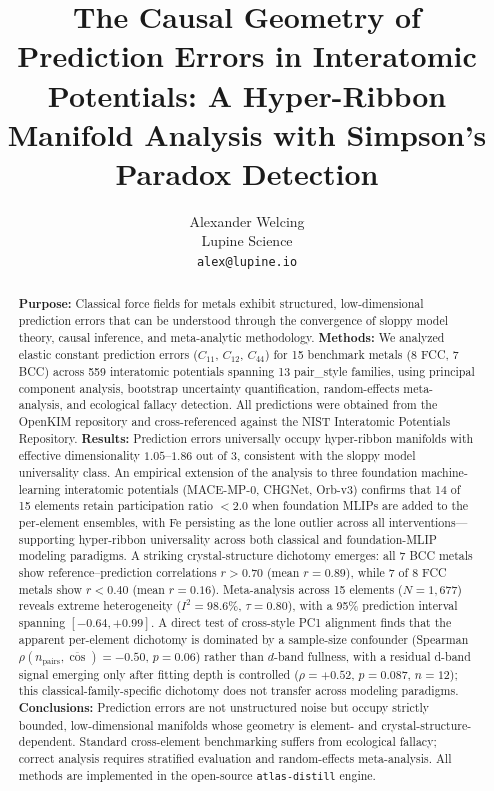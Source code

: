 \documentclass[twocolumn,9pt]{extarticle}
\begin{document}
\title{\bfseries The Causal Geometry of Prediction Errors in Interatomic Potentials: A Hyper-Ribbon Manifold Analysis with Simpson's Paradox Detection}
\author{Alexander Welcing\\
\small Lupine Science\\
\small \texttt{alex@lupine.io}}
\date{}

\begin{abstract}
\noindent\textbf{Purpose:} Classical force fields for metals exhibit structured, low-dimensional prediction errors that can be understood through the convergence of sloppy model theory, causal inference, and meta-analytic methodology.
\textbf{Methods:} We analyzed elastic constant prediction errors ($C_{11}$, $C_{12}$, $C_{44}$) for 15 benchmark metals (8 FCC, 7 BCC) across 559 interatomic potentials spanning 13 pair\_style families, using principal component analysis, bootstrap uncertainty quantification, random-effects meta-analysis, and ecological fallacy detection. All predictions were obtained from the OpenKIM repository and cross-referenced against the NIST Interatomic Potentials Repository.
\textbf{Results:} Prediction errors universally occupy hyper-ribbon manifolds with effective dimensionality $1.05$--$1.86$ out of 3, consistent with the sloppy model universality class. An empirical extension of the analysis to three foundation machine-learning interatomic potentials (MACE-MP-0, CHGNet, Orb-v3) confirms that 14 of 15 elements retain participation ratio $<2.0$ when foundation MLIPs are added to the per-element ensembles, with Fe persisting as the lone outlier across all interventions---supporting hyper-ribbon universality across both classical and foundation-MLIP modeling paradigms. A striking crystal-structure dichotomy emerges: all 7 BCC metals show reference--prediction correlations $r>0.70$ (mean $r=0.89$), while 7 of 8 FCC metals show $r<0.40$ (mean $r=0.16$). Meta-analysis across 15 elements ($N=1{,}677$) reveals extreme heterogeneity ($I^2=98.6\%$, $\tau=0.80$), with a 95\% prediction interval spanning $[-0.64, +0.99]$. A direct test of cross-style PC1 alignment finds that the apparent per-element dichotomy is dominated by a sample-size confounder (Spearman $\rho(n_{\text{pairs}}, \overline{\cos}) = -0.50$, $p = 0.06$) rather than $d$-band fullness, with a residual d-band signal emerging only after fitting depth is controlled ($\rho = +0.52$, $p = 0.087$, $n=12$); this classical-family-specific dichotomy does not transfer across modeling paradigms.
\textbf{Conclusions:} Prediction errors are not unstructured noise but occupy strictly bounded, low-dimensional manifolds whose geometry is element- and crystal-structure-dependent. Standard cross-element benchmarking suffers from ecological fallacy; correct analysis requires stratified evaluation and random-effects meta-analysis. All methods are implemented in the open-source \texttt{atlas-distill} engine.
\end{abstract}
\end{document}
